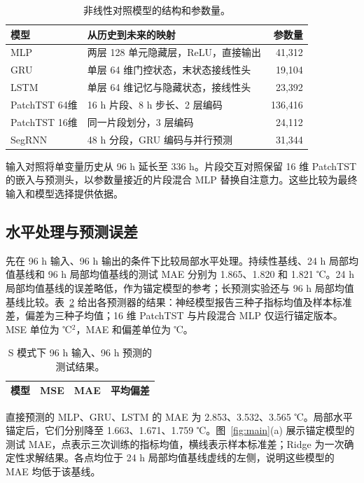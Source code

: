 \documentclass[UTF8,a4paper,11pt,fontset=windows]{ctexart}
\begin{document}
\begin{table}[htbp]
\centering\small
\caption{非线性对照模型的结构和参数量。}
\label{tab:models}
\begin{tabularx}{\linewidth}{lXr}
\toprule 模型 & 从历史到未来的映射 & 参数量\\\midrule
MLP & 两层 128 单元隐藏层，ReLU，直接输出 & 41,312\\
GRU & 单层 64 维门控状态，末状态接线性头 & 19,104\\
LSTM & 单层 64 维记忆与隐藏状态，接线性头 & 23,392\\
PatchTST 64维 & 16 h 片段、8 h 步长、2 层编码 & 136,416\\
PatchTST 16维 & 同一片段划分，3 层编码 & 24,112\\
SegRNN & 48 h 分段，GRU 编码与并行预测 & 31,344\\\bottomrule
\end{tabularx}
\end{table}

输入对照将单变量历史从 96 h 延长至 336 h。片段交互对照保留 16 维 PatchTST 的嵌入与预测头，以参数量接近的片段混合 MLP 替换自注意力。这些比较为最终输入和模型选择提供依据。

\FloatBarrier
\subsection{水平处理与预测误差}
先在 96 h 输入、96 h 输出的条件下比较局部水平处理。持续性基线、24 h 局部均值基线和 96 h 局部均值基线的测试 MAE 分别为 1.865、1.820 和 1.821 ℃。24 h 局部均值基线的误差略低，作为锚定模型的参考；长预测实验还与 96 h 局部均值基线比较。表~\ref{tab:main} 给出各预测器的结果：神经模型报告三种子指标均值及样本标准差，偏差为三种子均值；16 维 PatchTST 与片段混合 MLP 仅运行锚定版本。MSE 单位为 ℃$^2$，MAE 和偏差单位为 ℃。

\begin{table}[htbp]
\centering\small\setlength{\tabcolsep}{4pt}
\caption{S 模式下 96 h 输入、96 h 预测的测试结果。}
\label{tab:main}
\begin{tabular}{lccc}
\toprule 模型 & MSE & MAE & 平均偏差\\\midrule

\end{tabular}
\end{table}

直接预测的 MLP、GRU、LSTM 的 MAE 为 2.853、3.532、3.565 ℃。局部水平锚定后，它们分别降至 1.663、1.671、1.759 ℃。图~\ref{fig:main}(a) 展示锚定模型的测试 MAE，点表示三次训练的指标均值，横线表示样本标准差；Ridge 为一次确定性求解结果。各点均位于 24 h 局部均值基线虚线的左侧，说明这些模型的 MAE 均低于该基线。
\end{document}

